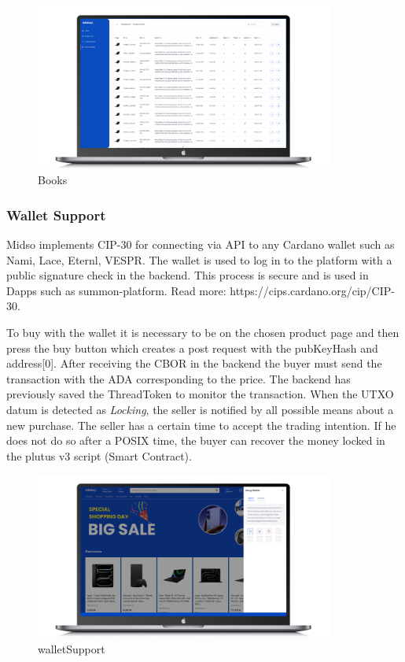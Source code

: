 \documentclass[12pt]{article}
\begin{document}
\begin{figure}[ht]
  \centering
  \includegraphics[width=0.88\textwidth, keepaspectratio]{product-books.png}
  \caption{Books}
  \label{fig:web}
\end{figure}

\subsubsection { Wallet Support } 

Midso implements CIP-30 for connecting via API to any Cardano wallet such as Nami, Lace, Eternl, VESPR. The wallet is used to log in to the platform with a public signature check in the backend. This process is secure and is used in Dapps such as summon-platform. Read more: https://cips.cardano.org/cip/CIP-30.

To buy with the wallet it is necessary to be on the chosen product page and then press the buy button which creates a post request with the pubKeyHash and address[0]. After receiving the CBOR in the backend the buyer must send the transaction with the ADA corresponding to the price. The backend has previously saved the ThreadToken to monitor the transaction. When the UTXO datum is detected as  \emph{Locking}, the seller is notified by all possible means about a new purchase. The seller has a certain time to accept the trading intention. If he does not do so after a POSIX time, the buyer can recover the money locked in the plutus v3 script (Smart Contract).

\begin{figure}[ht]
  \centering
  \includegraphics[width=0.88\textwidth, keepaspectratio]{walletSupport.png}
  \caption{walletSupport}
  \label{fig:web}
\end{figure}
\end{document}
